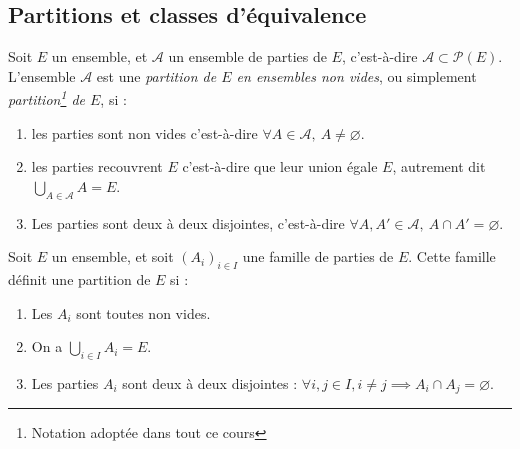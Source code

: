 \subsection{Partitions et classes d'équivalence}

\begin{definition}
Soit $E$ un ensemble, et $\mathcal A$ un ensemble de parties de $E$, c'est-à-dire $\mathcal A\subset \mathcal P(E)$. L'ensemble $\mathcal A$ est une \emph{partition de $E$ en ensembles non vides}, ou simplement \emph{partition\footnote{Notation adoptée dans tout ce cours} de $E$}, si : 
\begin{enumerate}
\item les parties sont non vides c'est-à-dire $\forall A\in \mathcal A, \: A\neq \varnothing$.
\item les parties recouvrent $E$ c'est-à-dire que leur union égale $E$, autrement dit $\bigcup_{A\in \mathcal A} A = E$.
\item Les parties sont deux à deux disjointes, c'est-à-dire $\forall A, A' \in \mathcal A, \: A\cap A' = \varnothing$.
\end{enumerate}
\end{definition}

\begin{exemple}
Soit $E$ un ensemble, et soit $(A_i)_{i\in I}$ une famille de parties de $E$. Cette famille définit une partition de $E$ si :
\begin{enumerate}
\item Les $A_i$ sont toutes non vides.
\item On a $\bigcup_{i\in I} A_i = E$.
\item Les parties $A_i$ sont deux à deux disjointes : $\forall i, j\in I, i\neq j \implies A_i\cap A_j=\varnothing$.
\end{enumerate}
\end{exemple}

